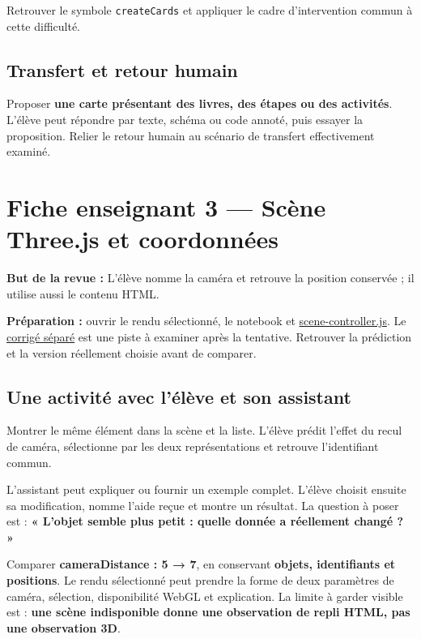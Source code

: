 \documentclass[
  canadien,
  11pt,
  a4paper,
]{report}
\begin{document}
Retrouver le symbole \texttt{create\allowbreak{}Cards} et appliquer le cadre
d'intervention commun à cette difficulté.

\section{Transfert et retour humain}\label{transfert-et-retour-humain-1}

Proposer \textbf{une carte présentant des livres, des étapes ou des
activités}. L'élève peut répondre par texte, schéma ou code annoté, puis
essayer la proposition. Relier le retour humain au scénario de transfert
effectivement examiné.

\chapter{Fiche enseignant 3 --- Scène Three.js et
coordonnées}\label{fiche-enseignant-3-scuxe8ne-three.js-et-coordonnuxe9es}

\textbf{But de la revue :} L'élève nomme la caméra et retrouve la
position conservée ; il utilise aussi le contenu HTML.

\textbf{Préparation :} ouvrir le rendu sélectionné, le notebook et
\href{../../frontend/module-3/scene-controller.js}{scene-controller.js}.
Le \href{../../notebooks/instructor/module-3.ipynb}{corrigé séparé} est
une piste à examiner après la tentative. Retrouver la prédiction et la
version réellement choisie avant de comparer.

\section{Une activité avec l'élève et son
assistant}\label{une-activituxe9-avec-luxe9luxe8ve-et-son-assistant-2}

Montrer le même élément dans la scène et la liste. L'élève prédit
l'effet du recul de caméra, sélectionne par les deux représentations et
retrouve l'identifiant commun.

L'assistant peut expliquer ou fournir un exemple complet. L'élève
choisit ensuite sa modification, nomme l'aide reçue et montre un
résultat. La question à poser est : \textbf{« L'objet semble plus petit
: quelle donnée a réellement changé ? »}

Comparer \textbf{cameraDistance : 5 → 7}, en conservant \textbf{objets,
identifiants et positions}. Le rendu sélectionné peut prendre la forme
de deux paramètres de caméra, sélection, disponibilité WebGL et
explication. La limite à garder visible est : \textbf{une scène
indisponible donne une observation de repli HTML, pas une observation
3D}.
\end{document}

